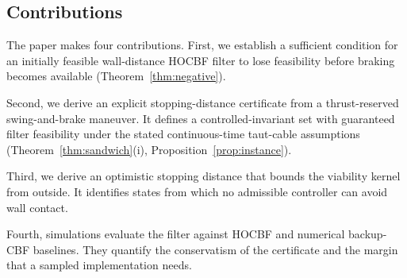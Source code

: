 \subsection{Contributions}

The paper makes four contributions.  First, we establish a sufficient condition for an initially feasible wall-distance HOCBF filter to lose feasibility before braking becomes available (Theorem~\ref{thm:negative}).

Second, we derive an explicit stopping-distance certificate from a thrust-reserved swing-and-brake maneuver.  It defines a controlled-invariant set with guaranteed filter feasibility under the stated continuous-time taut-cable assumptions (Theorem~\ref{thm:sandwich}(i), Proposition~\ref{prop:instance}).

Third, we derive an optimistic stopping distance that bounds the viability kernel from outside.  It identifies states from which no admissible controller can avoid wall contact.

Fourth, simulations evaluate the filter against HOCBF and numerical backup-CBF baselines.  They quantify the conservatism of the certificate and the margin that a sampled implementation needs.